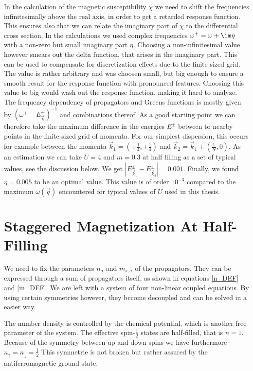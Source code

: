 \documentclass[a4paper,10pt]{report}
\begin{document}
In the calculation of the magnetic susceptibility $\chi$ we need to shift the frequencies infinitesimally above the real axis, 
in order to get a retarded response function. 
This ensures also that we can relate the imaginary part of $\chi$ to the differential cross section. 
In the calculations we used complex frequencies $\omega^+ = \omega + \im \eta$ with a non-zero but small imaginary part $\eta$. 
Choosing a non-infinitesimal value however smears out the delta function, that arises in the imaginary part.
This can be used to compensate for discretization effects due to the finite sized grid. 
%
The value is rather arbitrary and was choosen small, but big enough to ensure a smooth result for the response function with pronounced features.
Choosing this value to big would wash out the response function, making it hard to analyze.
The frequency dependency of propagators and Greens functions is mostly given by $(\omega^+-E^{\pm}_{\vec k})^{-1}$ and combinations thereof.
As a good starting point we can therefore take the maximum difference in the energies $E^{\pm}$ between to nearby points in the finite sized grid of momenta.
For our simplest dispersion, this occurs for example  between the momenta $\vec k_1 = (\pm \frac14,\pm\frac14)$ and $\vec k_2 = \vec k_1 + (\frac1N,0)$.
As an estimation we can take $U=4$ and $m=0.3$ at half filling as a set of typical values, see the discussion below.
We get $|E^{\pm}_{\vec k_1} - E^{\pm}_{\vec k_2}| = 0.001$.
Finally, we found $\eta=0.005$ to be an optimal value.
This value is of order $10^{-3}$ compared to the maximum $\omega(\vec q)$ encountered for typical values of $U$ used in this thesis.



\section{Staggered Magnetization At Half-Filling}
We need to fix the parameters $n_{\sigma}$ and $m_{s,\sigma}$ of the propagators.
They can be expressed through a sum of propagators itself, as shown in equations \ref{n_DEF} and \ref{m_DEF}.
We are left with a system of four non-linear coupled equations.
By using certain symmetries however, they become decoupled and can be solved in a easier way. 

The number density is controlled by the chemical potential, which is another free parameter of the system.
The effective spin-$\frac12$ states are half-filled, that is $n=1$. 
Because of the symmetry between up and down spins we have furthermore $n_{\uparrow}=n_{\downarrow} = \frac12$
This symmetrie is not broken but rather assured by the antiferromagnetic ground state.
\end{document}
